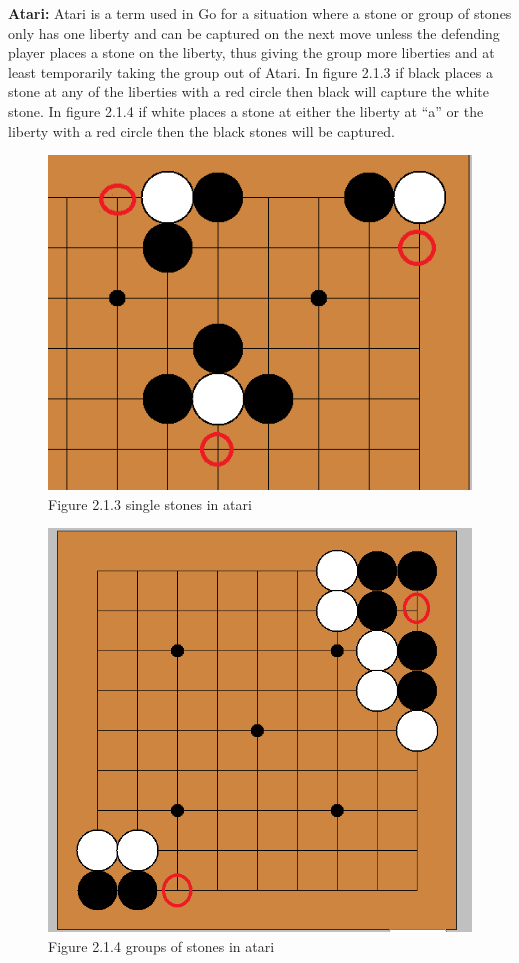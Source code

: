 \documentclass{l3proj}
\begin{document}
\textbf{Atari:} Atari is a term used in Go for a situation where a stone or group of stones only has one liberty and can be captured on the next move unless the defending player places a stone on the liberty, thus giving the group more liberties and at least temporarily taking the group out of Atari. In figure 2.1.3  if black places a stone at any of the liberties with a red circle then black will capture the white stone. In figure 2.1.4 if white places a stone at either the liberty at “a” or the liberty with a red circle then the black stones will be captured.

\begin{figure}[H]
\centering
\includegraphics[scale=0.5]{Images/singlestonesinatari.png}
\caption{Figure 2.1.3 single stones in atari}
\end{figure}

\begin{figure}[H]
\centering
\includegraphics[scale=0.5]{Images/groupsofstonesinatari.png}
\caption{Figure 2.1.4 groups of stones in atari}
\end{figure}
\end{document}
